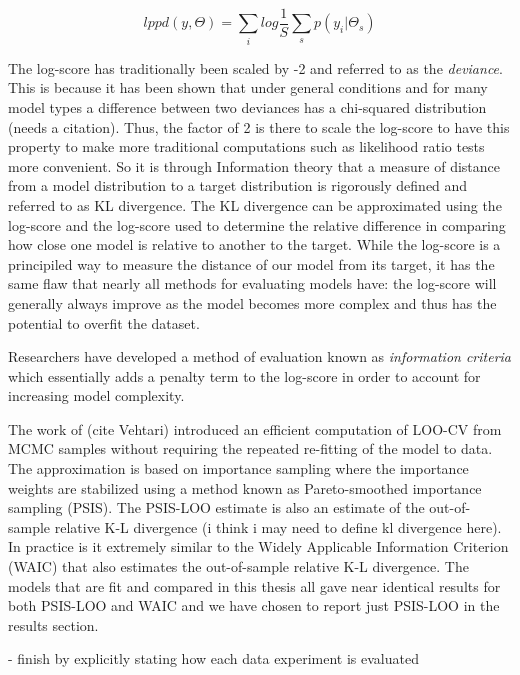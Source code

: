 \begin{equation}
lppd(y, \Theta) = \sum_i log \frac{1}{S} \sum_s p(y_i | \Theta_s)
\end{equation}

The log-score has traditionally been scaled by -2 and referred to as the \textit{deviance}. This is because it has been shown that under general conditions and for many model types a difference between two deviances has a chi-squared distribution (needs a citation). Thus, the factor of 2 is there to scale the log-score to have this property to make more traditional computations such as likelihood ratio tests more convenient. So it is through Information theory that a measure of distance from a model distribution to a target distribution is rigorously defined and referred to as KL divergence. The KL divergence can be approximated using the log-score and the log-score used to determine the relative difference in comparing how close one model is relative to another to the target. While the log-score is a principiled way to measure the distance of our model from its target, it has the same flaw that nearly all methods for evaluating models have: the log-score will generally always improve as the model becomes more complex and thus has the potential to overfit the dataset.

Researchers have developed a method of evaluation known as \textit{information criteria} which essentially adds a penalty term to the log-score in order to account for increasing model complexity.

The work of (cite Vehtari) introduced an efficient computation of LOO-CV from MCMC samples without requiring the repeated re-fitting of the model to data. The approximation is based on importance sampling where the importance weights are stabilized using a method known as Pareto-smoothed importance sampling (PSIS). The PSIS-LOO estimate is also an estimate of the out-of-sample relative K-L divergence (i think i may need to define kl divergence here). In practice is it extremely similar to the Widely Applicable Information Criterion (WAIC) that also estimates the out-of-sample relative K-L divergence. The models that are fit and compared in this thesis all gave near identical results for both PSIS-LOO and WAIC and we have chosen to report just PSIS-LOO in the results section.

- finish by explicitly stating how each data experiment is evaluated